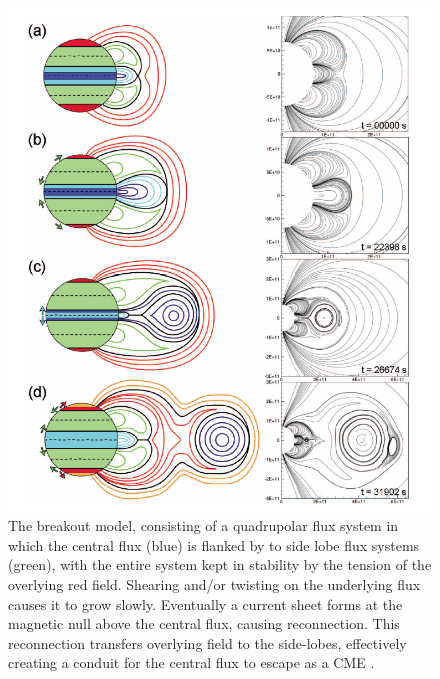 \begin{figure}[!t]
\begin{center}
\includegraphics[scale=0.45, trim=0cm 0cm 0cm 1cm]{images/lynch_breakout}
\caption[The breakout CME model]{The breakout model, consisting of a quadrupolar flux system in which the central flux (blue) is flanked by to side lobe flux systems (green), with the entire system kept in stability by the tension of the overlying red field. Shearing and/or twisting on the underlying flux causes it to grow slowly. Eventually a current sheet forms at the magnetic null above the central flux, causing reconnection. This reconnection transfers overlying field to the side-lobes, effectively creating a conduit for the central flux to escape as a CME \citep{lynch2008}.}
\label{fig:breakout_model}
\end{center}
\end{figure}


